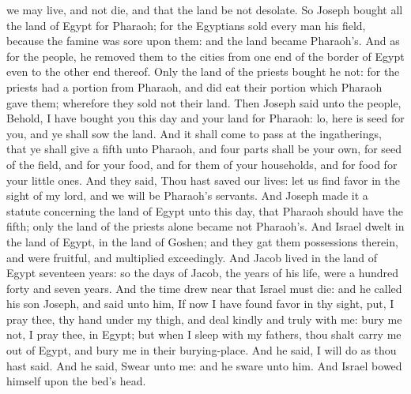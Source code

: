 we may live, and not die, and that the land be not desolate.  So Joseph bought all the land of Egypt for Pharaoh; for the Egyptians sold every man his field, because the famine was sore upon them: and the land became Pharaoh’s. And as for the people, he removed them to the cities from one end of the border of Egypt even to the other end thereof. Only the land of the priests bought he not: for the priests had a portion from Pharaoh, and did eat their portion which Pharaoh gave them; wherefore they sold not their land. Then Joseph said unto the people, Behold, I have bought you this day and your land for Pharaoh: lo, here is seed for you, and ye shall sow the land. And it shall come to pass at the ingatherings, that ye shall give a fifth unto Pharaoh, and four parts shall be your own, for seed of the field, and for your food, and for them of your households, and for food for your little ones. And they said, Thou hast saved our lives: let us find favor in the sight of my lord, and we will be Pharaoh’s servants. And Joseph made it a statute concerning the land of Egypt unto this day, that Pharaoh should have the fifth; only the land of the priests alone became not Pharaoh’s.  And Israel dwelt in the land of Egypt, in the land of Goshen; and they gat them possessions therein, and were fruitful, and multiplied exceedingly. And Jacob lived in the land of Egypt seventeen years: so the days of Jacob, the years of his life, were a hundred forty and seven years. And the time drew near that Israel must die: and he called his son Joseph, and said unto him, If now I have found favor in thy sight, put, I pray thee, thy hand under my thigh, and deal kindly and truly with me: bury me not, I pray thee, in Egypt; but when I sleep with my fathers, thou shalt carry me out of Egypt, and bury me in their burying-place. And he said, I will do as thou hast said. And he said, Swear unto me: and he sware unto him. And Israel bowed himself upon the bed’s head. 

